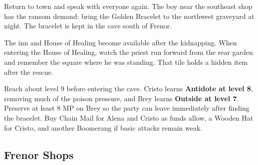 \documentclass[
  american,
  10pt,
  letterpaper,
  oneside,
  open=any]{scrreprt}
\begin{document}
Return to town and speak with everyone again. The boy near the southeast
shop has the ransom demand: bring the Golden Bracelet to the northwest
graveyard at night. The bracelet is kept in the cave south of Frenor.

The inn and House of Healing become available after the kidnapping. When
entering the House of Healing, watch the priest run forward from the
rear garden and remember the square where he was standing. That tile
holds a hidden item after the rescue.

Reach about level 9 before entering the cave. Cristo learns
\textbf{Antidote at level 8}, removing much of the poison pressure, and
Brey learns \textbf{Outside at level 7}. Preserve at least 8 MP on Brey
so the party can leave immediately after finding the bracelet. Buy Chain
Mail for Alena and Cristo as funds allow, a Wooden Hat for Cristo, and
another Boomerang if basic attacks remain weak.

\subsection{Frenor Shops}\label{frenor-shops}
\end{document}

